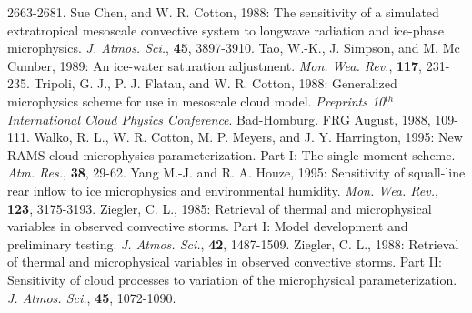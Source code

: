      2663-2681.
\decrefname
Sue Chen, and W. R. Cotton, 1988:
      The sensitivity of a simulated extratropical mesoscale convective system
      to longwave radiation and ice-phase microphysics.
      {\it J. Atmos. Sci.},
      {\bf 45},
      3897-3910.
\decrefname
Tao, W.-K., J. Simpson, and M. Mc Cumber, 1989:
      An ice-water saturation adjustment.
      {\it Mon. Wea. Rev.},
      {\bf 117},
      231-235.
\decrefname
Tripoli, G. J., P. J. Flatau, and W. R. Cotton, 1988:
      Generalized microphysics scheme for use in mesoscale cloud model.
      {\it Preprints 10$^{th}$ International Cloud Physics Conference}.
      Bad-Homburg. FRG August, 1988,
      109-111.
\decrefname
Walko, R. L., W. R. Cotton, M. P. Meyers, and J. Y. Harrington, 1995:
      New RAMS cloud microphysics parameterization. Part I: The single-moment
      scheme.
      {\it Atm. Res.},
      {\bf 38},
      29-62.
\decrefname
Yang M.-J. and R. A. Houze, 1995:
      Sensitivity of squall-line rear inflow to ice microphysics and
      environmental humidity.
      {\it Mon. Wea. Rev.},
      {\bf 123},
      3175-3193.
\decrefname
Ziegler, C. L., 1985:
      Retrieval of thermal and microphysical variables in observed convective
      storms. Part I: Model development and preliminary testing.
      {\it J. Atmos. Sci.},
      {\bf 42},
      1487-1509.
\decrefname
Ziegler, C. L., 1988:
      Retrieval of thermal and microphysical variables in observed convective
      storms. Part II: Sensitivity of cloud processes to variation of the
      microphysical parameterization.
      {\it J. Atmos. Sci.},
      {\bf 45},
      1072-1090.
\decrefname

%


